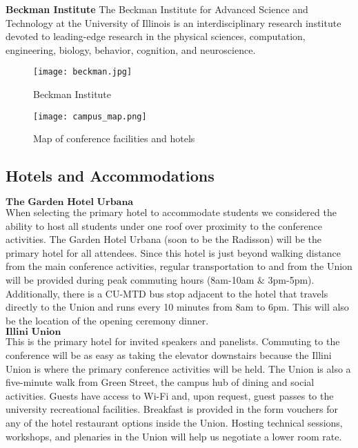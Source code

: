 \textbf{Beckman Institute}
The Beckman Institute for Advanced Science and Technology at the University of Illinois is an interdisciplinary research institute devoted to leading-edge research in the physical sciences, computation, engineering, biology, behavior, cognition, and neuroscience.\\

\begin{figure}[H]
	\centering
	\texttt{[image: beckman.jpg]}
	\caption{Beckman Institute}
	\label{fig:beckman}
\end{figure}

\begin{figure}[H]
	\centering
	\texttt{[image: campus\_map.png]}
	\caption{Map of conference facilities and hotels}
	\label{fig:conf-map}
\end{figure}


\subsection{Hotels and Accommodations}

$\textbf{The Garden Hotel Urbana}$\\
When selecting the primary hotel to accommodate students we considered the ability to host all students under one roof over proximity to the conference activities. The Garden Hotel Urbana (soon to be the Radisson) will be the primary hotel for all attendees. Since this hotel is just beyond walking distance from the main conference activities, regular transportation to and from the Union will be provided during peak commuting hours (8am-10am $\&$ 3pm-5pm). Additionally, there is a CU-MTD bus stop adjacent to the hotel that travels directly to the Union and runs every 10 minutes from 8am to 6pm. This will also be the location of the opening ceremony dinner.\\ 


$\textbf{Illini Union}$\\
This is the primary hotel for invited speakers and panelists. Commuting to the conference will be as easy as taking the elevator downstairs because the Illini Union is where the primary conference activities will be held. The Union is also a five-minute walk from Green Street, the campus hub of dining and social activities. Guests have access to Wi-Fi and, upon request, guest passes to the university recreational facilities. Breakfast is provided in the form vouchers for any of the hotel restaurant options inside the Union. Hosting technical sessions, workshops, and plenaries in the Union will help us negotiate a lower room rate.\\


